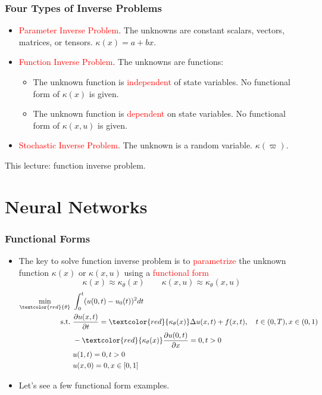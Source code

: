 \documentclass{beamer}
\begin{document}
\begin{frame}
	\frametitle{Four Types of Inverse Problems}
	
	\begin{itemize}
		\item \textcolor{red}{Parameter Inverse Problem}. The unknowns are constant scalars, vectors, matrices, or tensors. $\kappa(x) = a + bx$.
		\item \textcolor{red}{Function Inverse Problem}. The unknowns are functions:
		\begin{itemize}
		\item The unknown function is \textcolor{red}{independent} of state variables. No functional form of $\kappa(x)$ is given. 
		\item The unknown function is \textcolor{red}{dependent} on state variables. No functional form of $\kappa(x, u)$ is given. 
		\end{itemize}
		\item \textcolor{red}{Stochastic Inverse Problem}. The unknown is a random variable. $\kappa(\varpi)$.
	\end{itemize}
	
	This lecture: function inverse problem. 
\end{frame}


\section{Neural Networks}


\begin{frame}
	\frametitle{Functional Forms}
	
\begin{itemize}
	\item The key to solve function inverse problem is to \textcolor{red}{parametrize} the unknown function $\kappa(x)$ or $\kappa(x, u)$ using a \textcolor{red}{functional form}
	$$\kappa(x) \approx \kappa_\theta(x) \qquad \kappa(x, u) \approx \kappa_\theta(x, u)$$
	\begin{align*}
\min_{\textcolor{red}{\theta}}\ & \int_{0}^t ( u(0, t)- u_0(t))^2 dt\\
\mathrm{s.t.}\ & \frac{\partial u(x, t)}{\partial t} = \textcolor{red}{\kappa_\theta(x)}\Delta u(x, t) + f(x, t), \quad t\in (0,T), x\in (0,1) \\
& -\textcolor{red}{\kappa_\theta(x)}\frac{\partial u(0,t)}{\partial x} = 0, t>0\\
& u(1, t) = 0, t>0\\
& u(x, 0) = 0, x\in [0,1]
\end{align*}

\item Let's see a few functional form examples. 
\end{itemize}
\end{frame}
\end{document}
